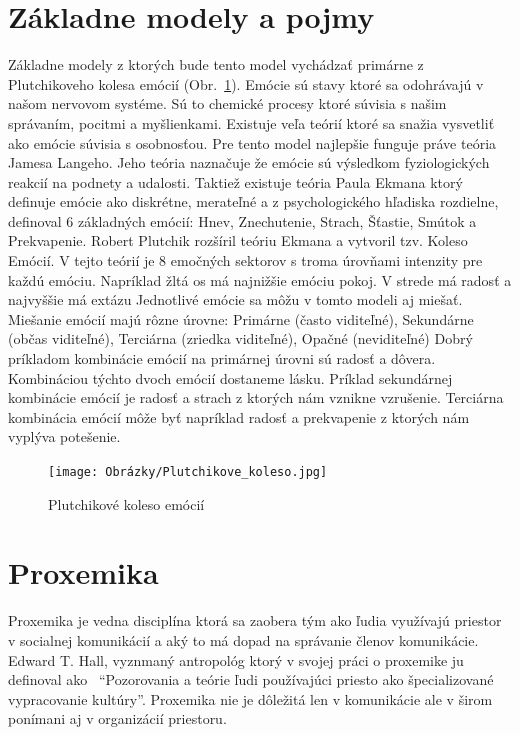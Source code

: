 \documentclass[10pt,twoside,slovak,a4paper]{article}
\begin{document}
\section{Základne modely a pojmy}\label{zaklad}

Základne modely z ktorých bude tento model vychádzať primárne z Plutchikoveho kolesa emócií
(Obr.~\ref{fig:EWheel}). Emócie sú stavy ktoré sa odohrávajú v našom nervovom systéme. Sú to chemické
procesy ktoré súvisia s našim správaním, pocitmi a myšlienkami. Existuje veľa teórií ktoré sa snažia
vysvetliť ako emócie súvisia s osobnosťou. Pre tento model najlepšie funguje práve teória Jamesa
Langeho. Jeho teória naznačuje že emócie sú výsledkom fyziologických reakcií na podnety a udalosti.
Taktiež existuje teória Paula Ekmana ktorý definuje emócie ako diskrétne, merateľné a z psychologického
hľadiska rozdielne, definoval 6 základných emócií: Hnev, Znechutenie, Strach, Šťastie, Smútok a
Prekvapenie. Robert Plutchik rozšíril teóriu Ekmana a vytvoril tzv. Koleso Emócií. V tejto teórií je 8
emočných sektorov s troma úrovňami intenzity pre každú emóciu. Napríklad žltá os má najnižšie
emóciu pokoj. V strede má radosť a najvyššie má extázu Jednotlivé emócie sa môžu v tomto modeli
aj miešať. Miešanie emócií majú rôzne úrovne: Primárne (často viditeľné), Sekundárne (občas viditeľné),
Terciárna (zriedka viditeľné), Opačné (neviditeľné) Dobrý príkladom kombinácie emócií na primárnej 
úrovni sú radosť a dôvera. Kombináciou týchto dvoch emócií dostaneme lásku. Príklad sekundárnej
kombinácie emócií je radosť a strach z ktorých nám vznikne vzrušenie. Terciárna kombinácia
emócií môže byť napríklad radosť a prekvapenie z ktorých nám vyplýva potešenie.

\begin{figure}[H]
		\centering
		\texttt{[image: Obrázky/Plutchikove\_koleso.jpg]}
		\caption{Plutchikové koleso emócií~\cite{emocie}}
		\label{fig:EWheel}
\end{figure}

\section{Proxemika}\label{proxemika}

Proxemika je vedna disciplína ktorá sa zaobera tým ako ľudia využívajú priestor v
socialnej komunikácií a aký to má dopad na správanie členov komunikácie. Edward T. Hall,
vyznmaný antropológ ktorý v svojej práci o proxemike ju definoval ako~\cite{proxemics} ``Pozorovania a teórie
ľudi používajúci priesto ako špecializované vypracovanie kultúry''. Proxemika nie je dôležitá
len v komunikácie ale v širom ponímani aj v organizácií priestoru.
\end{document}
